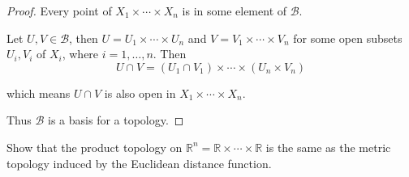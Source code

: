 \begin{proof}
	Every point of $X_{1}\times\cdots\times X_{n}$ is in some element of $\mathscr{B}$.

	Let $U, V\in \mathscr{B}$, then $U = U_{1}\times\cdots\times U_{n}$ and $V = V_{1}\times\cdots\times V_{n}$ for some open subsets $U_{i}, V_{i}$ of $X_{i}$, where $i = 1,\ldots,n$. Then
	\[
		U\cap V = (U_{1}\cap V_{1})\times\cdots\times (U_{n}\times V_{n})
	\]

	which means $U\cap V$ is also open in $X_{1}\times\cdots\times X_{n}$.

	Thus $\mathscr{B}$ is a basis for a topology.
\end{proof}

\begin{exercise}{3.26}
	Show that the product topology on $\mathbb{R}^{n} = \mathbb{R}\times\cdots\times\mathbb{R}$ is the same as the metric topology induced by the Euclidean distance function.
\end{exercise}

